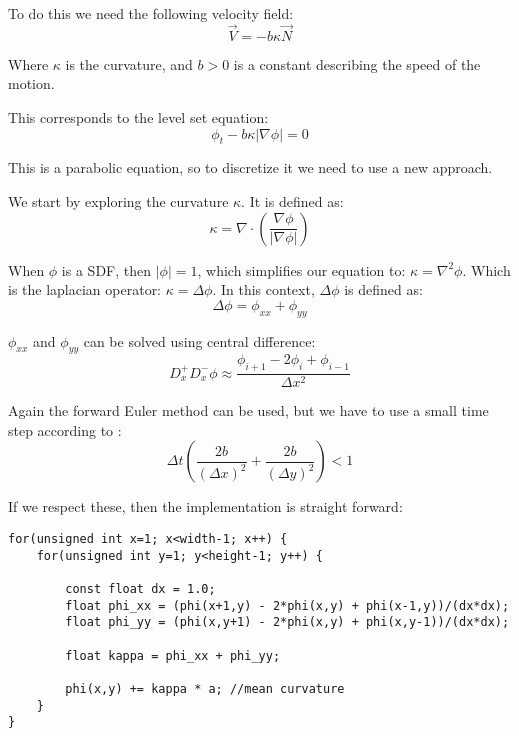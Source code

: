 To do this we need the following velocity field:
\begin{equation}
  \vec{V} = -b\kappa\vec{N}
\end{equation}

Where $\kappa$ is the curvature, and $b>0$ is a constant describing the
speed of the motion. 

This corresponds to the level set equation: 
\begin{equation}
  \phi_t -b\kappa|\nabla\phi| = 0
\end{equation}

This is a parabolic equation, so to discretize it we need to use a new
approach. 

We start by exploring the curvature $\kappa$. It is defined as:
\begin{equation}
  \kappa = \nabla\cdot\left(\frac{\nabla\phi}{|\nabla\phi|}\right)
\end{equation}

When $\phi$ is a SDF, then $|\phi|=1$, which simplifies our equation
to: $\kappa = \nabla^2\phi$. Which is the laplacian operator: $\kappa =
\Delta\phi$. In this context, $\Delta\phi$ is defined as:
\begin{equation}
  \Delta\phi = \phi_{xx} + \phi_{yy}
\end{equation}

$\phi_{xx}$ and $\phi_{yy}$ can be solved using central difference:
\begin{equation}
  D^+_xD^-_x\phi 
  \approx
  \frac{\phi_{i+1}-2\phi_i+\phi_{i-1}}{\Delta x^2}
\end{equation} %

Again the forward Euler method can be used, but we have to use a small
time step according to :
\begin{equation}
   \Delta t \left(
     \frac{2b}{(\Delta x)^2} +
     \frac{2b}{(\Delta y)^2}
   \right) < 1
\end{equation}

If we respect these, then the  implementation is straight forward:


\begin{lstlisting}
for(unsigned int x=1; x<width-1; x++) {
    for(unsigned int y=1; y<height-1; y++) {

        const float dx = 1.0;
        float phi_xx = (phi(x+1,y) - 2*phi(x,y) + phi(x-1,y))/(dx*dx);
        float phi_yy = (phi(x,y+1) - 2*phi(x,y) + phi(x,y-1))/(dx*dx);

        float kappa = phi_xx + phi_yy;
 
        phi(x,y) += kappa * a; //mean curvature
    }
}
\end{lstlisting}

